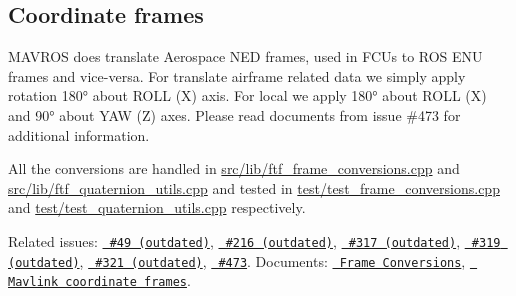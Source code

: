 \subsection*{Coordinate frames }

M\+A\+V\+R\+OS does translate Aerospace N\+ED frames, used in F\+C\+Us to R\+OS E\+NU frames and vice-\/versa. For translate airframe related data we simply apply rotation 180° about R\+O\+LL (X) axis. For local we apply 180° about R\+O\+LL (X) and 90° about Y\+AW (Z) axes. Please read documents from issue \#473 for additional information.

All the conversions are handled in {\ttfamily \mbox{\hyperlink{ftf__frame__conversions_8cpp}{src/lib/ftf\+\_\+frame\+\_\+conversions.\+cpp}}} and {\ttfamily \mbox{\hyperlink{ftf__quaternion__utils_8cpp}{src/lib/ftf\+\_\+quaternion\+\_\+utils.\+cpp}}} and tested in {\ttfamily \mbox{\hyperlink{test__frame__conversions_8cpp}{test/test\+\_\+frame\+\_\+conversions.\+cpp}}} and {\ttfamily \mbox{\hyperlink{test__quaternion__utils_8cpp}{test/test\+\_\+quaternion\+\_\+utils.\+cpp}}} respectively.

Related issues\+: \href{https://github.com/mavlink/mavros/issues/49}{\texttt{ \#49 (outdated)}}, \href{https://github.com/mavlink/mavros/issues/216}{\texttt{ \#216 (outdated)}}, \href{https://github.com/mavlink/mavros/issues/317}{\texttt{ \#317 (outdated)}}, \href{https://github.com/mavlink/mavros/issues/319}{\texttt{ \#319 (outdated)}}, \href{https://github.com/mavlink/mavros/issues/321}{\texttt{ \#321 (outdated)}}, \href{https://github.com/mavlink/mavros/issues/473}{\texttt{ \#473}}. Documents\+: \href{https://docs.google.com/document/d/1bDhaozrUu9F915T58WGzZeOM-McyU20dwxX-NRum1KA/edit}{\texttt{ Frame Conversions}}, \href{https://docs.google.com/spreadsheets/d/1LnsWTblU92J5_SMinTvBvHJWx6sqvzFa8SKbn8TXlnU/edit\#gid=0}{\texttt{ Mavlink coordinate frames}}.

